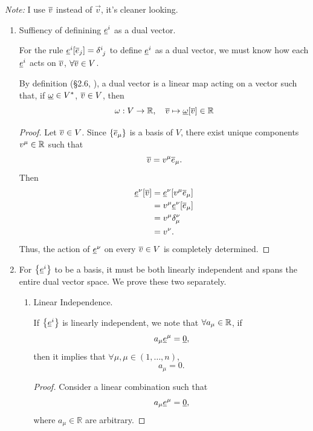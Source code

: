\begin{solution_pset}
		\textit{Note:} I use $\overline{v}$ instead of $\vec{v}$, it's cleaner looking.

		\begin{enumerate}[(1)]
			\item Suffiency of definining $\underline{e}^i$ as a dual vector.

				For the rule $\und{e}^i[\ovr{e}_j]=\delta\indices{^i_j}$ to define $\underline{e}^i$ as a dual vector, 
				  we must know how 
				  each $\underline{e}^i$ acts on $\overline{v}$, $\forall \overline{v}\in V$.

				  By definition (\S 2.6, \cite{juan2026}), a dual vector
				  is a linear map acting on a vector such that, if $\underline{\omega}\in V^*$,
				  $\overline{v}\in V$, then
				  \[
					  \omega: V\to \mathbb{R},\quad \overline{v} \mapsto\underline{\omega}[\overline{v}]\in \mathbb{R}
				  \]

					\begin{proof}
						Let $\overline{v}\in V$. Since $\{\overline{e}_\mu\}$ is a basis of $V$,
						there exist unique components $v^\mu\in\mathbb{R}$ such that
						\[
							\overline{v}=v^\mu \overline{e}_\mu.
						\]
						Then
						\begin{align*}
							\underline{e}^\nu[\overline{v}]
							&=\underline{e}^\nu[v^\mu \overline{e}_\mu]\\
							&=v^\mu \underline{e}^\nu[\overline{e}_\mu]\\
							&=v^\mu \delta^\nu_\mu\\
							&=v^\nu.
						\end{align*}
						Thus, the action of $\underline{e}^\nu$ on every $\overline{v}\in V$ is
						completely determined. 
					\end{proof}
			\item For $\qty{\underline{e}^i}$ to be a basis, it must be both linearly independent and 
				  spans the entire dual vector space. We prove these two separately.
			
				\begin{enumerate}

					\item Linear Independence.

						If $\qty{\underline{e}^i}$ is linearly independent, we note that
						$\forall a_\mu \in \mathbb{R}$, if
						\[
							a_\mu \underline{e}^\mu =\underline{0},
						\]
						then it implies that $\forall \mu, \mu \in (1,\ldots,n)$,
						\[
							a_\mu = 0.
						\]
						\begin{proof}
							Consider a linear combination such that
							\[
								a_\mu \underline{e}^\mu = \underline{0},
							\]
							where $a_\mu\in\mathbb{R}$ are arbitrary.


\end{proof}
\end{enumerate}
\end{enumerate}
\end{solution_pset}
